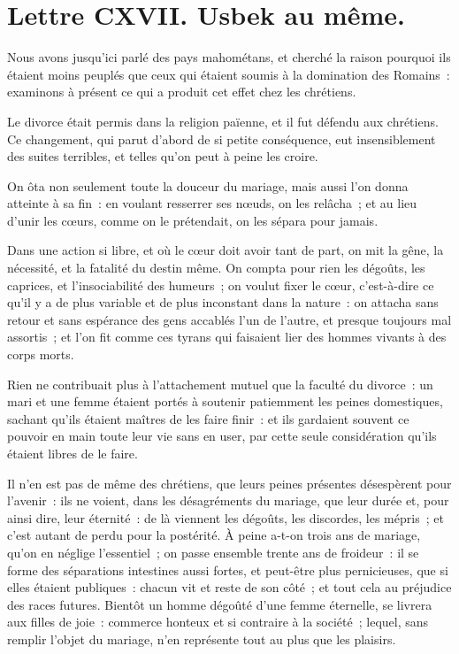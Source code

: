 \documentclass[french,twoside]{book} %
\newcommand{\dateline}[1]{\medskip{\RaggedLeft{#1}\par}\bigskip}
\begin{document}
\dateline{De Paris, le 16 de la lune de Chahban, 1718.}
\section[{Lettre CXVII. Usbek au même.}]{Lettre CXVII. Usbek au même.}\renewcommand{\leftmark}{Lettre CXVII. Usbek au même.}

\noindent Nous avons jusqu’ici parlé des pays mahométans, et cherché la raison pourquoi ils étaient moins peuplés que ceux qui étaient soumis à la domination des Romains : examinons à présent ce qui a produit cet effet chez les chrétiens.\par
Le divorce était permis dans la religion païenne, et il fut défendu aux chrétiens. Ce changement, qui parut d’abord de si petite conséquence, eut insensiblement des suites terribles, et telles qu’on peut à peine les croire.\par
On ôta non seulement toute la douceur du mariage, mais aussi l’on donna atteinte à sa fin : en voulant resserrer ses nœuds, on les relâcha ; et au lieu d’unir les cœurs, comme on le prétendait, on les sépara pour jamais.\par
Dans une action si libre, et où le cœur doit avoir tant de part, on mit la gêne, la nécessité, et la fatalité du destin même. On compta pour rien les dégoûts, les caprices, et l’insociabilité des humeurs ; on voulut fixer le cœur, c’est-à-dire ce qu’il y a de plus variable et de plus inconstant dans la nature : on attacha sans retour et sans espérance des gens accablés l’un de l’autre, et presque toujours mal assortis ; et l’on fit comme ces tyrans qui faisaient lier des hommes vivants à des corps morts.\par
Rien ne contribuait plus à l’attachement mutuel que la faculté du divorce : un mari et une femme étaient portés à soutenir patiemment les peines domestiques, sachant qu’ils étaient maîtres de les faire finir : et ils gardaient souvent ce pouvoir en main toute leur vie sans en user, par cette seule considération qu’ils étaient libres de le faire.\par
Il n’en est pas de même des chrétiens, que leurs peines présentes désespèrent pour l’avenir : ils ne voient, dans les désagréments du mariage, que leur durée et, pour ainsi dire, leur éternité : de là viennent les dégoûts, les discordes, les mépris ; et c’est autant de perdu pour la postérité. À peine a-t-on trois ans de mariage, qu’on en néglige l’essentiel ; on passe ensemble trente ans de froideur : il se forme des séparations intestines aussi fortes, et peut-être plus pernicieuses, que si elles étaient publiques : chacun vit et reste de son côté ; et tout cela au préjudice des races futures. Bientôt un homme dégoûté d’une femme éternelle, se livrera aux filles de joie : commerce honteux et si contraire à la société ; lequel, sans remplir l’objet du mariage, n’en représente tout au plus que les plaisirs.\par
\end{document}
